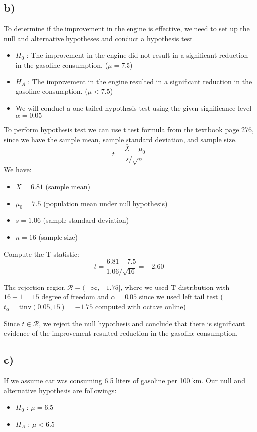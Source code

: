 \documentclass[12pt]{article}
\begin{document}
\subsection*{b)}
To determine if the improvement in the engine is effective, we need to set up the null and alternative hypotheses and conduct a hypothesis test.
\begin{itemize}
    \item $H_0$ : The improvement in the engine did not result in a significant reduction in the gasoline consumption. ($\mu = 7.5$)
    \item $H_A$ : The improvement in the engine resulted in a significant reduction in the gasoline consumption. ($\mu < 7.5$)
    \item We will conduct a one-tailed hypothesis test using the given significance level $\alpha = 0.05$ 
\end{itemize}
To perform hypothesis test we can use t test formula from the textbook page 276, since we have the sample mean, sample standard deviation, and sample size.
$$t= \dfrac{\bar{X}-\mu_0}{s/\sqrt{n}}$$
We have: 
\begin{itemize}
    \item $\bar{X} = 6.81$ (sample mean)
    \item $\mu_0 = 7.5$ (population mean under null hypothesis)
    \item $s= 1.06$ (sample standard deviation)
    \item $n=16$ (sample size)
\end{itemize}
Compute the T-statistic:
$$t= \dfrac{6.81 - 7.5}{1.06/\sqrt{16}} = -2.60$$

The rejection region $\mathcal{R} = (-\infty, -1.75]$, where we used T-distribution with $16-1= 15$ degree of freedom and $\alpha=0.05$ since we used left tail test ($t_\alpha = \text{tinv}(0.05, 15) = -1.75$ computed with octave online)

Since $t \in \mathcal{R}$, we reject the null hypothesis and conclude that there is significant evidence of the improvement resulted reduction in the gasoline consumption.

\subsection*{c)} 
If we assume car was consuming 6.5 liters of gasoline per 100 km. Our null and alternative hypothesis are followings:
\begin{itemize}
    \item $H_0$ : $\mu = 6.5$
    \item $H_A$ : $\mu < 6.5$
\end{itemize}
\end{document}
